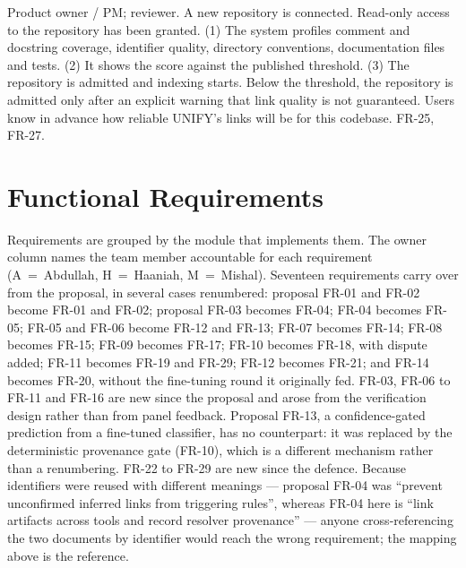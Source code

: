   {Product owner / PM; reviewer.}
  {A new repository is connected.}
  {Read-only access to the repository has been granted.}
  {(1) The system profiles comment and docstring coverage, identifier quality,
   directory conventions, documentation files and tests.
   (2) It shows the score against the published threshold.
   (3) The repository is admitted and indexing starts.}
  {Below the threshold, the repository is admitted only after an explicit
   warning that link quality is not guaranteed.}
  {Users know in advance how reliable UNIFY's links will be for this codebase.}
  {FR-25, FR-27.}

\section{Functional Requirements}
\label{sec:fr}

Requirements are grouped by the module that implements them. The owner column
names the team member accountable for each requirement (A~=~Abdullah,
H~=~Haaniah, M~=~Mishal). Seventeen requirements carry over from the proposal, in several cases
renumbered: proposal FR-01 and FR-02 become FR-01 and FR-02; proposal FR-03
becomes FR-04; FR-04 becomes FR-05; FR-05 and FR-06 become FR-12 and FR-13;
FR-07 becomes FR-14; FR-08 becomes FR-15; FR-09 becomes FR-17; FR-10 becomes
FR-18, with dispute added; FR-11 becomes FR-19 and FR-29; FR-12 becomes FR-21;
and FR-14 becomes FR-20, without the fine-tuning round it originally fed. FR-03,
FR-06 to FR-11 and FR-16 are new since the proposal and arose from the
verification design rather than from panel feedback. Proposal FR-13, a
confidence-gated prediction from a fine-tuned classifier, has no counterpart: it
was replaced by the deterministic provenance gate (FR-10), which is a different
mechanism rather than a renumbering. FR-22 to FR-29 are new since the defence.
Because identifiers were reused with different meanings --- proposal FR-04 was
``prevent unconfirmed inferred links from triggering rules'', whereas FR-04 here
is ``link artifacts across tools and record resolver provenance'' --- anyone
cross-referencing the two documents by identifier would reach the wrong
requirement; the mapping above is the reference.

